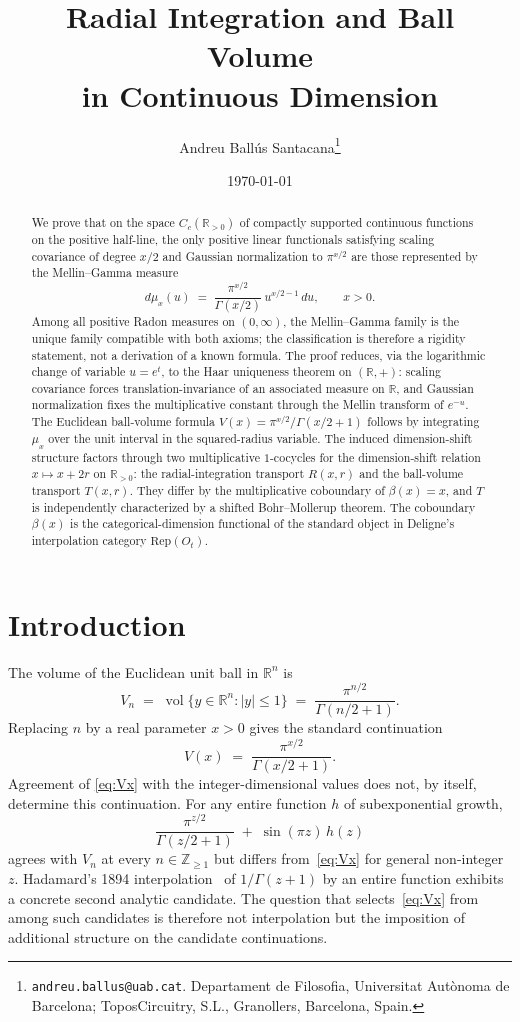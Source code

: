 \documentclass[11pt,a4paper]{article}
\title{Radial Integration and Ball Volume\\
in Continuous Dimension}
\author{Andreu Ballús Santacana\thanks{\texttt{andreu.ballus@uab.cat}.
Departament de Filosofia, Universitat Autònoma de Barcelona; ToposCircuitry, S.L.,
Granollers, Barcelona, Spain.}}
\date{\today}
\theoremstyle{plain}
\theoremstyle{definition}
\theoremstyle{remark}
\newcommand{\R}{\mathbb{R}}
\newcommand{\Z}{\mathbb{Z}}
\newcommand{\Cc}{C_c}
\begin{document}
\maketitle

\begin{abstract}
We prove that on the space $\Cc(\R_{>0})$ of compactly supported continuous functions on the positive half-line, the only positive linear functionals satisfying scaling covariance of degree $x/2$ and Gaussian normalization to $\pi^{x/2}$ are those represented by the Mellin--Gamma measure
\[
d\mu_x(u) \;=\; \frac{\pi^{x/2}}{\Gamma(x/2)}\,u^{x/2-1}\,du, \qquad x>0.
\]
Among all positive Radon measures on $(0,\infty)$, the Mellin--Gamma family is the unique family compatible with both axioms; the classification is therefore a rigidity statement, not a derivation of a known formula. The proof reduces, via the logarithmic change of variable $u=e^t$, to the Haar uniqueness theorem on $(\R,+)$: scaling covariance forces translation-invariance of an associated measure on $\R$, and Gaussian normalization fixes the multiplicative constant through the Mellin transform of $e^{-u}$. The Euclidean ball-volume formula $V(x)=\pi^{x/2}/\Gamma(x/2+1)$ follows by integrating $\mu_x$ over the unit interval in the squared-radius variable. The induced dimension-shift structure factors through two multiplicative $1$-cocycles for the dimension-shift relation $x\mapsto x+2r$ on $\R_{>0}$: the radial-integration transport $R(x,r)$ and the ball-volume transport $T(x,r)$. They differ by the multiplicative coboundary of $\beta(x)=x$, and $T$ is independently characterized by a shifted Bohr--Mollerup theorem. The coboundary $\beta(x)$ is the categorical-dimension functional of the standard object in Deligne's interpolation category $\mathrm{Rep}(O_t)$.
\end{abstract}

\section{Introduction}\label{sec:intro}

The volume of the Euclidean unit ball in $\R^n$ is
\begin{equation}\label{eq:Vn}
V_n \;=\; \operatorname{vol}\bigl\{y\in\R^n : |y|\le 1\bigr\} \;=\; \frac{\pi^{n/2}}{\Gamma(n/2+1)}.
\end{equation}
Replacing $n$ by a real parameter $x>0$ gives the standard continuation
\begin{equation}\label{eq:Vx}
V(x) \;=\; \frac{\pi^{x/2}}{\Gamma(x/2+1)}.
\end{equation}
Agreement of \eqref{eq:Vx} with the integer-dimensional values does not, by itself, determine this continuation. For any entire function $h$ of subexponential growth,
\[
\frac{\pi^{z/2}}{\Gamma(z/2+1)}\;+\;\sin(\pi z)\,h(z)
\]
agrees with $V_n$ at every $n\in\Z_{\ge 1}$ but differs from~\eqref{eq:Vx} for general non-integer $z$. Hadamard's 1894 interpolation~\cite{Hadamard1894} of $1/\Gamma(z+1)$ by an entire function exhibits a concrete second analytic candidate. The question that selects~\eqref{eq:Vx} from among such candidates is therefore not interpolation but the imposition of additional structure on the candidate continuations.
\end{document}
